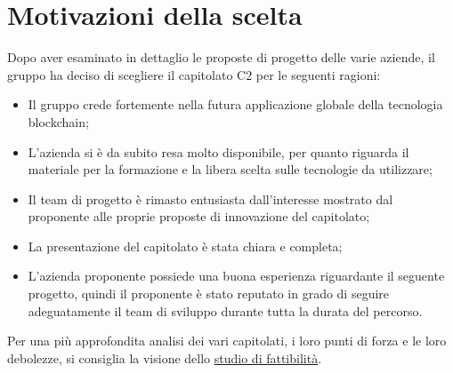 \section{Motivazioni della scelta}\label{section:motivazioni}

Dopo aver esaminato in dettaglio le proposte di progetto delle varie aziende, il gruppo ha deciso di scegliere il capitolato C2 per le seguenti ragioni:
\begin{itemize}
    \item Il gruppo crede fortemente nella futura applicazione globale della tecnologia blockchain;
    \item L'azienda si è da subito resa molto disponibile, per quanto riguarda il materiale per la formazione e la libera scelta sulle tecnologie da utilizzare;
    \item Il team di progetto è rimasto entusiasta dall'interesse mostrato dal proponente alle proprie proposte di innovazione del capitolato;
    \item La presentazione del capitolato è stata chiara e completa;
    \item L'azienda proponente possiede una buona esperienza riguardante il seguente progetto, quindi il proponente è stato reputato in grado di seguire adeguatamente il team di sviluppo durante tutta la durata del percorso.
\end{itemize}
Per una più approfondita analisi dei vari capitolati, i loro punti di forza e le loro debolezze, 
si consiglia la visione dello \href{https://yakuzaishi-swe.github.io/docs/docs/studio_fattibilita.pdf}{studio di fattibilità}.
